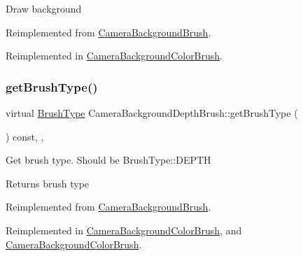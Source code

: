 Draw background 

Reimplemented from \hyperlink{classCameraBackgroundBrush_aa079883211a8ebabf567a1967b325087}{Camera\+Background\+Brush}.



Reimplemented in \hyperlink{classCameraBackgroundColorBrush_aa07e5c7ea9d5c233c51920bf75d1381b}{Camera\+Background\+Color\+Brush}.

\mbox{\label{classCameraBackgroundDepthBrush_ad4cc258ce1a1cd3ac43ea0d2580409d5}} 
\subsubsection{\texorpdfstring{get\+Brush\+Type()}{getBrushType()}\hspace{0.1cm}{\footnotesize\ttfamily [1/2]}}
{\footnotesize\ttfamily virtual \hyperlink{classCameraBackgroundBrush_acb83e8d05e7ab9386c041d22c444760f}{Brush\+Type} Camera\+Background\+Depth\+Brush\+::get\+Brush\+Type (\begin{DoxyParamCaption}{ }\end{DoxyParamCaption}) const\hspace{0.3cm}{\ttfamily [inline]}, {\ttfamily [override]}, {\ttfamily [virtual]}}

Get brush type. Should be Brush\+Type\+::\+D\+E\+P\+TH \begin{DoxyReturn}{Returns}
brush type 
\end{DoxyReturn}


Reimplemented from \hyperlink{classCameraBackgroundBrush_a72447fd86e40e0d7e263b906c2f9af12}{Camera\+Background\+Brush}.



Reimplemented in \hyperlink{classCameraBackgroundColorBrush_a96ecf77baa742b668db0d22c350b8f1b}{Camera\+Background\+Color\+Brush}, and \hyperlink{classCameraBackgroundColorBrush_a96ecf77baa742b668db0d22c350b8f1b}{Camera\+Background\+Color\+Brush}.

\mbox{\label{classCameraBackgroundDepthBrush_ad4cc258ce1a1cd3ac43ea0d2580409d5}} 
